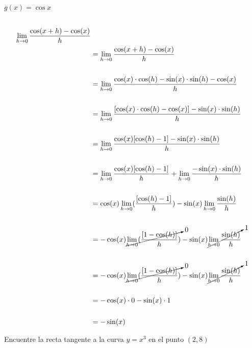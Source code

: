 \documentclass{article}
\begin{document}
$g(x) = \cos x$ 
\begin{equation*} 
\begin{split}
 \\\lim_{h\to 0}\frac{\cos(x+h)-\cos(x)}{h}\\
     &=\lim_{h\to 0}\frac{\cos(x+h)-\cos(x)}{h}\\
     \\
     &=\lim_{h\to 0}\frac{\cos(x)\cdot\cos(h)-\sin(x)\cdot \sin(h)-\cos(x)}{h}\\
     \\
     &=\lim_{h\to 0}\frac{[\cos(x)\cdot\cos(h)-\cos(x)]-\sin(x)\cdot \sin(h)}{h}\\
     \\
     &=\lim_{h\to 0}\frac{\cos(x)[\cos(h)-1]-\sin(x)\cdot \sin(h)}{h}\\
     \\
     &=\lim_{h\to 0}\frac{\cos(x)[\cos(h)-1]}{h}+\lim_{h\to 0}\frac{-\sin(x)\cdot \sin(h)}{h} \\\
     \\
     &=\cos(x)\lim_{h\to 0}(\frac{[\cos(h)-1]}{h})-\sin(x)\lim_{h\to 0} \frac{\sin(h)}{h} \\
     \\
     &=-\cos(x)\cancelto{0}{\lim_{h\to 0}(\frac{[1-\cos(h)]}{h})}-\sin(x)\cancelto{1}{\lim_{h\to 0} \frac{\sin(h)}{h}} \\
     \\
     &=-\cos(x)\cancelto{0}{\lim_{h\to 0}(\frac{[1-\cos(h)]}{h})}-\sin(x)\cancelto{1}{\lim_{h\to 0} \frac{\sin(h)}{h}} \\
     \\
     &=-\cos(x)\cdot0-\sin(x)\cdot 1 \\
     \\
     &=-\sin(x)\\
\end{split}
\end{equation*}
\newpage

Encuentre la recta tangente a la curva $y=x^3$ en el punto $(2,8)$
\end{document}
